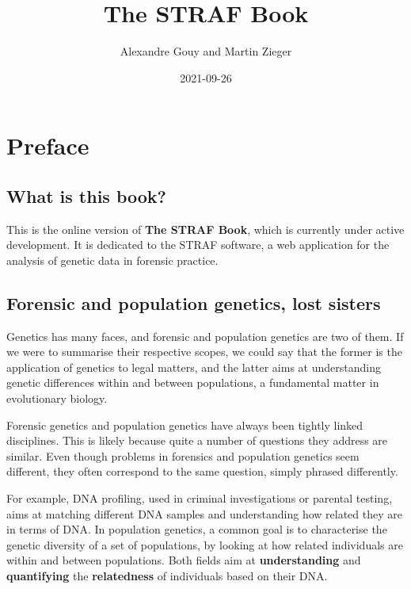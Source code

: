 \documentclass[
]{book}
\title{The STRAF Book}
\author{Alexandre Gouy and Martin Zieger}
\date{2021-09-26}
\begin{document}
\maketitle

{
\setcounter{tocdepth}{1}
\tableofcontents
}
\hypertarget{preface}{%
\chapter*{Preface}\label{preface}}

\hypertarget{what-is-this-book}{%
\section*{What is this book?}\label{what-is-this-book}}

This is the online version of \textbf{The STRAF Book}, which is currently under
active development. It is dedicated to the STRAF software, a web application
for the analysis of genetic data in forensic practice.

\hypertarget{forensic-and-population-genetics-lost-sisters}{%
\section*{Forensic and population genetics, lost sisters}\label{forensic-and-population-genetics-lost-sisters}}

Genetics has many faces, and forensic and population genetics are two of them.
If we were to summarise their respective scopes, we could say that the former
is the application of genetics to legal matters, and the latter aims at
understanding genetic differences within and between populations, a
fundamental matter in evolutionary biology.

Forensic genetics and population genetics have always been tightly linked
disciplines. This is likely because quite a number of questions they address
are similar. Even though problems in forensics and population genetics seem
different, they often correspond to the same question, simply phrased differently.

For example, DNA profiling, used in criminal investigations or parental testing,
aims at matching different DNA samples and understanding how related they are in
terms of DNA. In population genetics, a common goal is to characterise the
genetic diversity of a set of populations, by looking at how related individuals
are within and between populations. Both fields aim at \textbf{understanding} and
\textbf{quantifying} the \textbf{relatedness} of individuals based on their DNA.
\end{document}
